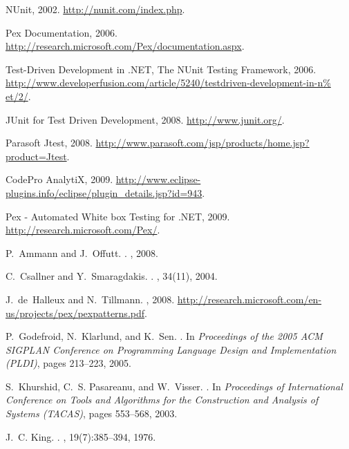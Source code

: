 \documentclass{sig-alternate}
\begin{document}
\begin{thebibliography}{10}

{{NUnit}}, 2002.
\newblock \url{http://nunit.com/index.php}.

{Pex Documentation}, 2006.
\newblock \url{http://research.microsoft.com/Pex/documentation.aspx}.

{Test-Driven Development in {.NET}, The {NUnit} Testing Framework}, 2006.
\newblock
  \url{http://www.developerfusion.com/article/5240/testdriven-development-in-n%
et/2/}.

{JUnit for Test Driven Development}, 2008.
\newblock \url{http://www.junit.org/}.

{Parasoft {Jtest}}, 2008.
\newblock \url{http://www.parasoft.com/jsp/products/home.jsp?product=Jtest}.

{CodePro AnalytiX}, 2009.
\newblock
  \url{http://www.eclipse-plugins.info/eclipse/plugin_details.jsp?id=943}.

{Pex - Automated White box Testing for .NET}, 2009.
\newblock \url{http://research.microsoft.com/Pex/}.

P.~Ammann and J.~Offutt.
.
, 2008.

C.~Csallner and Y.~Smaragdakis.
.
, 34(11), 2004.

J.~de~Halleux and N.~Tillmann.
, 2008.
\newblock
  \url{http://research.microsoft.com/en-us/projects/pex/pexpatterns.pdf}.

P.~Godefroid, N.~Klarlund, and K.~Sen.
.
\newblock In {\em Proceedings of the 2005 ACM SIGPLAN Conference on Programming
  Language Design and Implementation (PLDI)}, pages 213--223, 2005.

S.~Khurshid, C.~S. Pasareanu, and W.~Visser.
.
\newblock In {\em Proceedings of International Conference on Tools and
  Algorithms for the Construction and Analysis of Systems (TACAS)}, pages
  553--568, 2003.

J.~C. King.
.
, 19(7):385--394, 1976.


\end{thebibliography}
\end{document}
